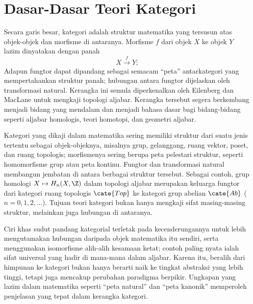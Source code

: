 
\chapter{Dasar-Dasar Teori Kategori}\label{sec:category}
Secara garis besar, kategori adalah struktur matematika yang tersusun atas objek-objek dan morfisme di antaranya. Morfisme $f$ dari objek $X$ ke objek $Y$ lazim dinyatakan dengan panah
\[ X \xrightarrow{f} Y; \]
Adapun fungtor dapat dipandang sebagai semacam ``peta'' antarkategori yang mempertahankan struktur panah; hubungan antara fungtor dijelaskan oleh transformasi natural. Kerangka ini semula diperkenalkan oleh Eilenberg dan MacLane \cite{EM45} untuk mengkaji topologi aljabar. Kerangka tersebut segera berkembang menjadi bidang yang mendalam dan menjadi bahasa dasar bagi bidang-bidang seperti aljabar homologis, teori homotopi, dan geometri aljabar.

Kategori yang dikaji dalam matematika sering memiliki struktur dari suatu jenis tertentu sebagai objek-objeknya, misalnya grup, gelanggang, ruang vektor, poset, dan ruang topologis; morfismenya sering berupa peta pelestari struktur, seperti homomorfisme grup atau peta kontinu. Fungtor dan transformasi natural membangun jembatan di antara berbagai struktur tersebut. Sebagai contoh, grup homologi $X \mapsto H_n(X, \Z)$ dalam topologi aljabar merupakan keluarga fungtor dari kategori ruang topologis $\cate{Top}$ ke kategori grup abelian $\cate{Ab}$ ($n=0,1,2,\ldots$). Tujuan teori kategori bukan hanya mengkaji sifat masing-masing struktur, melainkan juga hubungan di antaranya.

Ciri khas sudut pandang kategorial terletak pada kecenderungannya untuk lebih mengutamakan hubungan daripada objek matematika itu sendiri, serta menggunakan isomorfisme alih-alih kesamaan ketat; contoh paling nyata ialah sifat universal yang hadir di mana-mana dalam aljabar. Karena itu, beralih dari himpunan ke kategori bukan hanya berarti naik ke tingkat abstraksi yang lebih tinggi, tetapi juga mencakup perubahan paradigma berpikir. Ungkapan yang lazim dalam matematika seperti ``peta natural'' dan ``peta kanonik'' memperoleh penjelasan yang tepat dalam kerangka kategori.

